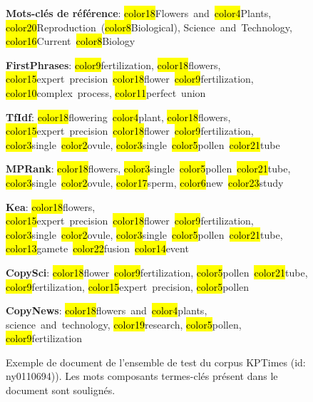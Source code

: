 \begin{figure}
\begin{mdframed}[backgroundcolor=blue!2, font=\small]
\textbf{Mots-clés de référence}: \hl{color18}{Flowers}~{and}~\hl{color4}{Plants}, \hl{color20}{Reproduction}~(\hl{color8}{Biological}), Science~{and}~Technology, \hl{color16}{Current}~\hl{color8}{Biology}

\textbf{FirstPhrases}: \hl{color9}{fertilization}, \hl{color18}{flowers}, \hl{color15}{expert~precision}~\hl{color18}{flower}~\hl{color9}{fertilization}, \hl{color10}{complex~process}, \hl{color11}{perfect~union}

\textbf{TfIdf}: \hl{color18}{flowering}~\hl{color4}{plant}, \hl{color18}{flowers}, \hl{color15}{expert~precision}~\hl{color18}{flower}~\hl{color9}{fertilization}, \hl{color3}{single}~\hl{color2}{ovule}, \hl{color3}{single}~\hl{color5}{pollen}~\hl{color21}{tube}

\textbf{MPRank}: \hl{color18}{flowers}, \hl{color3}{single}~\hl{color5}{pollen}~\hl{color21}{tube}, \hl{color3}{single}~\hl{color2}{ovule}, \hl{color17}{sperm}, \hl{color6}{new}~\hl{color23}{study}

\textbf{Kea}: \hl{color18}{flowers}, \hl{color15}{expert~precision}~\hl{color18}{flower}~\hl{color9}{fertilization}, \hl{color3}{single}~\hl{color2}{ovule}, \hl{color3}{single}~\hl{color5}{pollen}~\hl{color21}{tube}, \hl{color13}{gamete}~\hl{color22}{fusion}~\hl{color14}{event}

\textbf{CopySci}: \hl{color18}{flower}~\hl{color9}{fertilization}, \hl{color5}{pollen}~\hl{color21}{tube}, \hl{color9}{fertilization}, \hl{color15}{expert~precision}, \hl{color5}{pollen}

\textbf{CopyNews}: \hl{color18}{flowers}~{and}~\hl{color4}{plants}, science~{and}~technology, \hl{color19}{research}, \hl{color5}{pollen}, \hl{color9}{fertilization}

    \vspace{0.2em}

    
    \end{mdframed}%
    \caption{Exemple de document de l'ensemble de test du corpus KPTimes (id: {\small ny0110694})). Les mots composants termes-clés présent dans le document sont soulignés.}
    \label{fig:_}
\end{figure}
